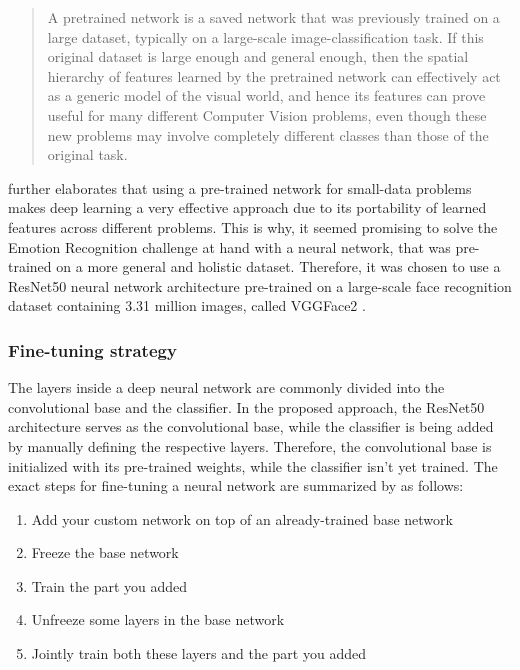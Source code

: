 \begin{quote}
    A pretrained network is a saved network that was previously trained on a large dataset, typically on a large-scale image-classification task. If this original dataset is large enough and general enough, then the spatial hierarchy of features learned by the pretrained network can effectively act as a generic model of the visual world, and hence its features can prove useful for many different Computer Vision problems, even though these new problems may involve completely different classes than those of the original task. \citep{Chollet:2017:DeepLearningPython}
\end{quote}

\citet{Chollet:2017:DeepLearningPython} further elaborates that using a pre-trained network for small-data problems makes deep learning a very effective approach due to its portability of learned features across different problems.
\newline\newline
This is why, it seemed promising to solve the Emotion Recognition challenge at hand with a neural network, that was pre-trained on a more general and holistic dataset. Therefore, it was chosen to use a ResNet50 neural network architecture pre-trained on a large-scale face recognition dataset containing 3.31 million images, called VGGFace2 \citep{Cao:2018:VGGFace2}.


\subsubsection{Fine-tuning strategy}
The layers inside a deep neural network are commonly divided into the convolutional base and the classifier. In the proposed approach, the ResNet50 architecture serves as the convolutional base, while the classifier is being added by manually defining the respective layers. Therefore, the convolutional base is initialized with its pre-trained weights, while the classifier isn't yet trained.
\newline\newline
The exact steps for fine-tuning a neural network are summarized by \citet{Chollet:2017:DeepLearningPython} as follows:
\begin{enumerate}
    \item Add your custom network on top of an already-trained base network
    \item Freeze the base network
    \item Train the part you added
    \item Unfreeze some layers in the base network
    \item Jointly train both these layers and the part you added
\end{enumerate}


